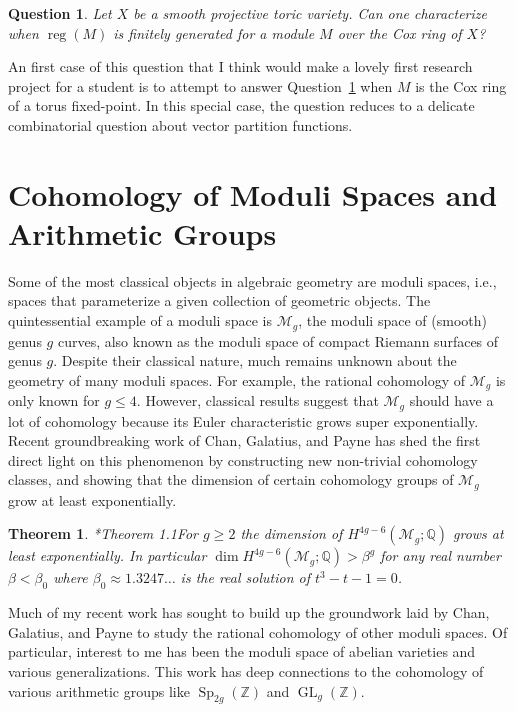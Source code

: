 \documentclass[11pt,reqno]{amsart}
\newtheorem{theorem}[lemma]{Theorem}
\newtheorem{question}[lemma]{Question}
\theoremstyle{remark}
\newcommand{\reg}{\operatorname{reg}}
\newcommand{\GL}{{\operatorname{GL}}}
\newcommand{\Sp}{\operatorname{Sp}}
\newcommand{\cM}{\mathcal{M}}
\newcommand{\Q}{\mathbb{Q}}
\newcommand{\Z}{\mathbb{Z}}
\begin{document}
\begin{question}\label{quest:finitegen}
Let $X$ be a smooth projective toric variety. Can one characterize when $\reg(M)$ is finitely generated for a module $M$ over the Cox ring of $X$?
\end{question} 

An first case of this question that I think would make a lovely first research project for a student is to attempt to answer Question~\ref{quest:finitegen} when $M$ is the Cox ring of a torus fixed-point. In this special case, the question reduces to a delicate combinatorial question about vector partition functions.




\section{Cohomology of Moduli Spaces and Arithmetic Groups}

Some of the most classical objects in algebraic geometry are moduli spaces, i.e., spaces that parameterize a given collection of geometric objects. The quintessential example of a moduli space is $\cM_{g}$, the moduli space of (smooth) genus $g$ curves, also known as the moduli space of compact Riemann surfaces of genus $g$. Despite their classical nature, much remains unknown about the geometry of many moduli spaces. For example, the rational cohomology of $\cM_{g}$ is only known for $g\leq 4$. However, classical results suggest that $\cM_{g}$ should have a lot of cohomology because its Euler characteristic grows super exponentially. Recent groundbreaking work of Chan, Galatius, and Payne has shed the first direct light on this phenomenon by constructing new non-trivial cohomology classes, and showing that the dimension of certain cohomology groups of $\cM_{g}$ grow at least exponentially. 

\begin{theorem}\cite{CGP21}*{Theorem 1.1}\label{thm:Mg}
For $g\geq2$ the dimension of $H^{4g-6}(\cM_{g};\Q)$ grows at least exponentially. In particular $\dim H^{4g-6}\left(\cM_{g}; \Q\right) > \beta^{g}$ for any real number $\beta<\beta_{0}$ where $\beta_{0}\approx1.3247\ldots$ is the real solution of $t^3-t-1=0$. 
\end{theorem}

Much of my recent work has sought to build up the groundwork laid by Chan, Galatius, and Payne to study the rational cohomology of other moduli spaces. Of particular, interest to me has been the moduli space of abelian varieties and various generalizations. This work has deep connections to the cohomology of various arithmetic groups like $\Sp_{2g}(\Z)$ and  $\GL_{g}(\Z)$. 
\end{document}
